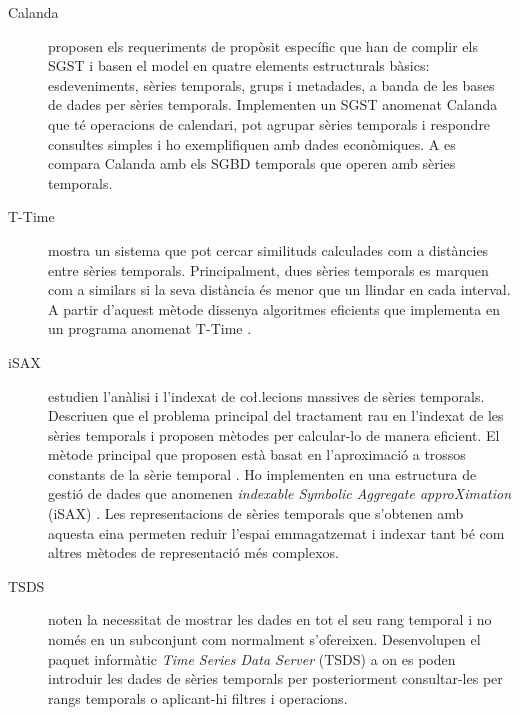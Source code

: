 \begin{description}

\item[Calanda] \textcite{dreyer94} proposen els requeriments de propòsit específic que han de complir els SGST i basen el model en quatre elements estructurals bàsics: esdeveniments, sèries temporals, grups i metadades, a banda de les bases de dades per sèries temporals. Implementen un SGST anomenat Calanda \parencite{dreyer94b,dreyer95,dreyer95b} que té operacions de calendari, pot agrupar sèries temporals i respondre consultes simples i ho exemplifiquen amb dades econòmiques. A \cite{schmidt95} es compara Calanda amb els SGBD temporals que operen amb sèries temporals. 




\item[T-Time] \textcite{assfalg08:thesis} mostra un sistema que pot cercar similituds calculades com a distàncies entre sèries temporals. Principalment, dues sèries temporals es marquen com a similars si la seva distància és menor que un llindar en cada interval. A partir d'aquest mètode dissenya algoritmes eficients que implementa en un programa anomenat T-Time \parencite{assfalg08:ttime}.


 
\item[iSAX] \textcite{keogh08:isax,keogh10:isax} estudien l'anàlisi i l'indexat de co\l.lecions massives de sèries temporals. Descriuen que el problema principal del tractament rau en l'indexat de les sèries temporals i proposen mètodes per calcular-lo de manera eficient. El mètode principal que proposen està basat en l'aproximació a trossos constants de la sèrie temporal \parencite{keogh00}.  Ho implementen en una estructura de gestió de dades que anomenen \emph{indexable Symbolic Aggregate approXimation} (iSAX) \parencite{isax}. Les representacions de sèries temporals que s'obtenen amb aquesta eina permeten reduir l'espai emmagatzemat i indexar tant bé com altres mètodes de representació més complexos.




\item[TSDS]
\textcite{weigel10} noten la necessitat de mostrar les dades en tot el seu rang temporal i no només en un subconjunt com normalment s'ofereixen. Desenvolupen el paquet informàtic \emph{Time Series Data Server} (TSDS) \parencite{tsds} a on es poden introduir les dades de sèries temporals per posteriorment consultar-les per rangs temporals o aplicant-hi filtres i operacions.






\end{description}
